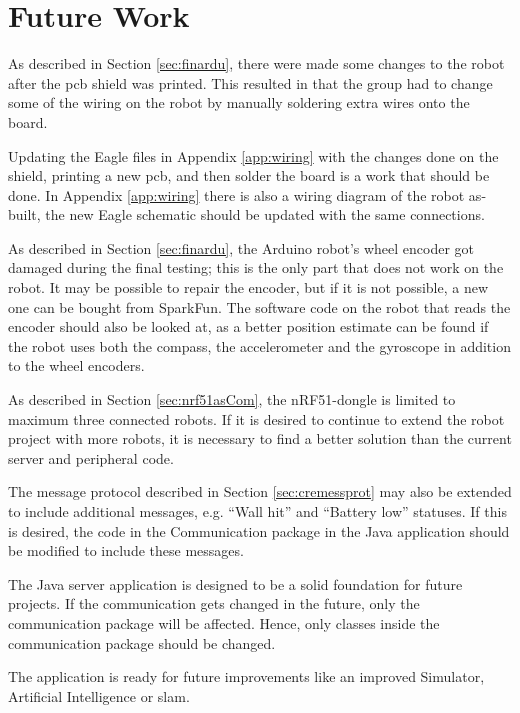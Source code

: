 \chapter{Future Work}
        \label{sec:fwSkjold}
        As described in Section \ref{sec:finardu}, there were made some changes to the robot after the \acrshort{pcb} shield was printed. This resulted in that the group had to change some of the wiring on the robot by manually soldering extra wires onto the board.

        Updating the Eagle files in Appendix \ref{app:wiring} with the changes done on the shield, printing a new \acrshort{pcb}, and then solder the board is a work that should be done. In Appendix \ref{app:wiring} there is also a wiring diagram of the robot as-built, the new Eagle schematic should be updated with the same connections.

        As described in Section \ref{sec:finardu}, the Arduino robot's wheel encoder got damaged during the final testing; this is the only part that does not work on the robot. It may be possible to repair the encoder, but if it is not possible, a new one can be bought from SparkFun\cite{sparkfun}. The software code on the robot that reads the encoder should also be looked at, as a better position estimate can be found if the robot uses both the compass, the accelerometer and the gyroscope in addition to the wheel encoders.

        As described in Section \ref{sec:nrf51asCom}, the nRF51-dongle is limited to maximum three connected robots. If it is desired to continue to extend the robot project with more robots, it is necessary to find a better solution than the current server and peripheral code.

        The message protocol described in Section \ref{sec:cremessprot} may also be extended to include additional messages, e.g. ``Wall hit'' and ``Battery low'' statuses. If this is desired, the code in the Communication package in the Java application should be modified to include these messages.
        
        The Java server application is designed to be a solid foundation for future projects. If the communication gets changed in the future, only the communication package will be affected. Hence, only classes inside the communication package should be changed.

        The application is ready for future improvements like an improved Simulator, Artificial Intelligence or \acrshort{slam}.
